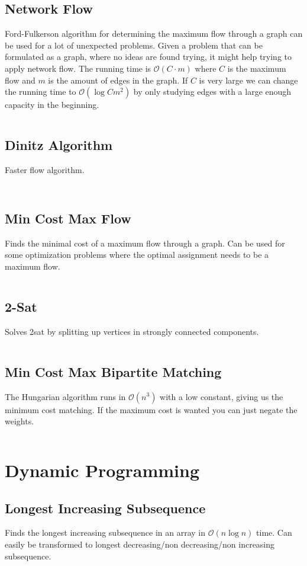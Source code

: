 \documentclass[8pt,a4paper,landscape,oneside]{amsart}
\newcommand{\codej}[1]{\inputminted[fontsize=\large,tabsize=2,baselinestretch=1]{java}{src/#1}}
\newcommand{\codec}[1]{\inputminted[fontsize=\large,tabsize=2,baselinestretch=1]{cpp}{src/#1}}
\newcommand{\codep}[1]{\inputminted[fontsize=\large,tabsize=2,baselinestretch=1]{py}{src/#1}}
\newcommand{\bigO}{\mathcal{O}}
\begin{document}
\begin{multicols*}{2}
\begin{large}
    \subsection{Network Flow}
        Ford-Fulkerson algorithm for determining the maximum flow through a graph can be used for a lot of unexpected problems. Given a problem that can be formulated as a graph, where no ideas are found trying, it might help trying to apply network flow. The running time is $\bigO (C \cdot m)$ where $C$ is the maximum flow and $m$ is the amount of edges in the graph.
        If $C$ is very large we can change the running time to $\bigO (\log{C}m^2)$ by only studying edges with a large enough capacity in the beginning.
        \codep{graphs/flow.py}
    \subsection{Dinitz Algorithm}
    Faster flow algorithm.
        \codep{graphs/dinitz.py}
        \codec{graphs/dinic.cpp}
    \subsection{Min Cost Max Flow}
        Finds the minimal cost of a maximum flow through a graph.
        Can be used for some optimization problems where the optimal assignment needs to be a maximum flow.
        \codej{graphs/MinCostMaxFlow.java}
    \subsection{2-Sat}
        Solves 2sat by splitting up vertices in strongly connected components.
        \codej{graphs/TwoSat.py}
    \subsection{Min Cost Max Bipartite Matching}
        The Hungarian algorithm runs in $\bigO(n^3)$ with a low constant, giving us the minimum cost matching. If the maximum cost is wanted you can just negate the weights.
        \codec{graphs/Hungarian.cpp}

\section{Dynamic Programming}
    \subsection{Longest Increasing Subsequence}
        Finds the longest increasing subsequence in an array in $\bigO(n \log{n})$ time. Can easily be transformed to longest decreasing/non decreasing/non increasing subsequence.
        \codej{dynamicprogramming/lis.py}

\end{large}
\end{multicols*}
\end{document}
